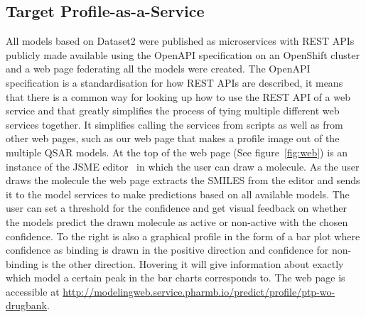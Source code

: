 \documentclass[utf8]{frontiersSCNS} %
\begin{document}
\subsection*{Target Profile-as-a-Service}
All models based on Dataset2 were published as microservices with REST APIs
publicly made available using the OpenAPI specification on an OpenShift cluster
and a web page federating all the models were created. The OpenAPI
specification is a standardisation for how REST APIs are described, it means
that there is a common way for looking up how to use the REST API of a web
service and that greatly simplifies the process of tying multiple different web
services together. It simplifies calling the services from scripts as well as
from other web pages, such as our web page that makes a profile image out of
the multiple QSAR models. At the top of the web page (See figure~\ref{fig:web})
is an instance of the JSME editor~\cite{Bienfait2013} in which the user can
draw a molecule. As the user draws the molecule the web page extracts the
SMILES from the editor and sends it to the model services to make predictions
based on all available models. The user can set a threshold for the confidence
and get visual feedback on whether the models predict the drawn molecule as
active or non-active with the chosen confidence.  To the right is also a
graphical profile in the form of a bar plot where confidence as binding is
drawn in the positive direction and confidence for non-binding is the other
direction. Hovering it will give information about exactly which model a
certain peak in the bar charts corresponds to. The web page is accessible at
\url{http://modelingweb.service.pharmb.io/predict/profile/ptp-wo-drugbank}.
\end{document}

